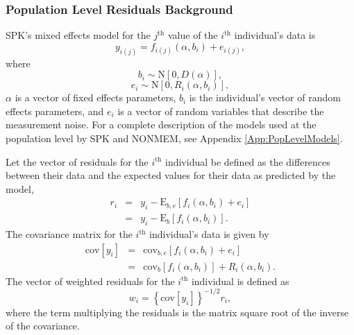 \documentclass{article}
\begin{document}
\subsubsection{Population Level Residuals Background}

SPK's mixed effects model for the $j^{\mbox{th}}$ value of the 
$i^{\mbox{th}}$ individual's data is
  \begin{equation}
    y_{i(j)} = f_{i(j)}(\alpha, b_i) + e_{i(j)} ,
  \end{equation}
where
  \begin{equation}
    b_i \sim \mbox{N}[ 0, D(\alpha) ] ,
  \end{equation}
  \begin{equation}
    e_i \sim \mbox{N}[ 0, R_i(\alpha, b_i) ] ,
  \end{equation}
$\alpha$ is a vector of fixed effects parameters, 
$b_i$ is the individual's vector of random effects parameters,
and $e_i$ is a vector of random variables that describe the
measurement noise.
For a complete description of the models used at the population 
level by SPK and NONMEM, see Appendix \ref{App:PopLevelModels}.

Let the vector of residuals for the $i^{\mbox{th}}$ individual be
defined as the differences between their data and the expected values 
for their data as predicted by the model,
  \begin{eqnarray}
    r_i & = & y_i - \mbox{E}_{b,e} 
                \left[ f_i(\alpha, b_i) + e_i \right] \nonumber \\
        & = & y_i - \mbox{E}_{b} \left[ f_i(\alpha, b_i) \right] .
  \end{eqnarray}
The covariance matrix for the $i^{\mbox{th}}$ individual's data is
given by
  \begin{eqnarray}
    \mbox{cov}[y_i] & = & \mbox{cov}_{b,e}
          \left[ f_i(\alpha, b_i) + e_i \right] \nonumber \\
        & = & \mbox{cov}_{b} \left[ f_i(\alpha, b_i) \right]
                  + R_i(\alpha, b_i) .
  \end{eqnarray}
The vector of weighted residuals for the $i^{\mbox{th}}$ individual is
defined as 
  \begin{equation}
    w_i = \left\{ \mbox{cov}[y_i] \right\}^{-1/2} r_i,
  \end{equation}
where the term multiplying the residuals is the matrix square 
root of the inverse of the covariance.
\end{document}
